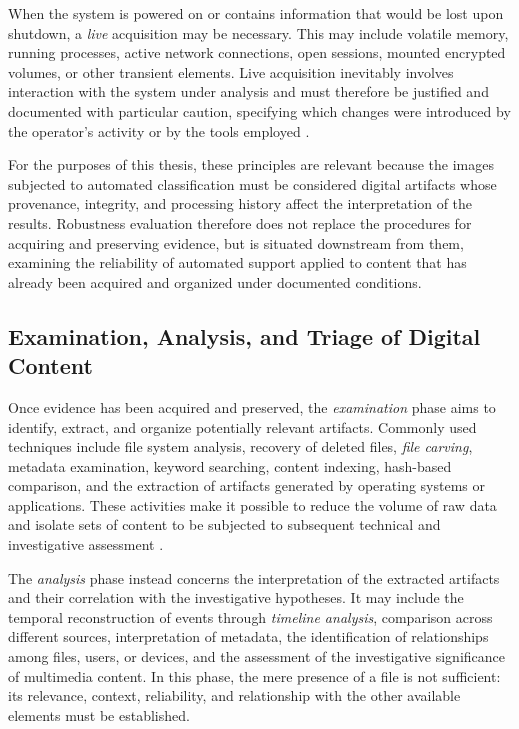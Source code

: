 When the system is powered on or contains information that would be lost upon
shutdown, a \textit{live} acquisition may be necessary. This may include
volatile memory, running processes, active network connections, open sessions,
mounted encrypted volumes, or other transient elements. Live acquisition
inevitably involves interaction with the system under analysis and must
therefore be justified and documented with particular caution, specifying which
changes were introduced by the operator's activity or by the tools employed
\cite{nist2006guide,casey2011digital}.

For the purposes of this thesis, these principles are relevant because the
images subjected to automated classification must be considered digital
artifacts whose provenance, integrity, and processing history affect the
interpretation of the results. Robustness evaluation therefore does not replace
the procedures for acquiring and preserving evidence, but is situated
downstream from them, examining the reliability of automated support applied to
content that has already been acquired and organized under documented
conditions.


\subsection{Examination, Analysis, and Triage of Digital Content}
\label{subsec:background_examination_analysis}
Once evidence has been acquired and preserved, the \textit{examination} phase
aims to identify, extract, and organize potentially relevant artifacts. Commonly
used techniques include file system analysis, recovery of deleted files,
\textit{file carving}, metadata examination, keyword searching, content
indexing, hash-based comparison, and the extraction of artifacts generated by
operating systems or applications. These activities make it possible to reduce
the volume of raw data and isolate sets of content to be subjected to subsequent
technical and investigative assessment
\cite{carrier2005filesystem,casey2011digital,nist2006guide}.

The \textit{analysis} phase instead concerns the interpretation of the extracted
artifacts and their correlation with the investigative hypotheses. It may
include the temporal reconstruction of events through \textit{timeline
analysis}, comparison across different sources, interpretation of metadata, the
identification of relationships among files, users, or devices, and the
assessment of the investigative significance of multimedia content. In this
phase, the mere presence of a file is not sufficient: its relevance, context,
reliability, and relationship with the other available elements must be
established.


